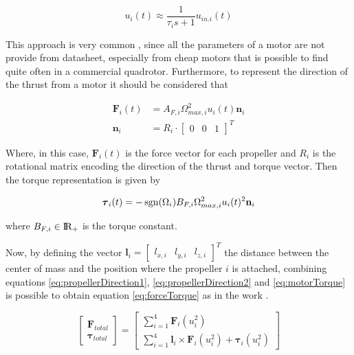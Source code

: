 \begin{equation}
	u_i(t) \approx \frac{1}{\tau_i s+1}u_{in.i}(t)
	\label{eq:motorDelay}
\end{equation}

\noindent This approach is very common \cite{motor}, since all the parameters of a motor are not provide from datasheet, especially from cheap motors that is possible to find quite often in a commercial quadrotor. Furthermore, to represent the direction of the thrust from a motor it should be considered that 

\begin{align}
	\mathbf{F}_i(t) &= A_{F,i} \Omega_{max,i}^2u_i(t)\mathbf{n}_i \label{eq:propellerDirection1} \\
	\mathbf{n}_i &= R_i \cdot 
	\begin{bmatrix} 
		0 & 0 & 1 
	\end{bmatrix}^T 
	\label{eq:propellerDirection2}
\end{align} 

\noindent Where, in this case, $\mathbf{F}_i(t)$ is the force vector for each propeller and $R_i$ is the rotational matrix encoding the direction of the thrust and torque vector. Then the torque representation is given by

\begin{equation}
	\boldsymbol{\tau}_i(t) = -\operatorname*{sgn}(\Omega_i)B_{F,i}\Omega_{max,i}^2u_i(t)^2\mathbf{n}_i
	\label{eq:motorTorque}
\end{equation}

\noindent where $B_{F,i} \in \rm I\!R_+$ is the torque constant.

\noindent Now, by defining the vector $\mathbf{l}_i = \begin{bmatrix} l_{x,i} & l_{y,i} & l_{z,i} \end{bmatrix}^T$ the distance between the center of mass and the position where the propeller $i$ is attached, combining equations \eqref{eq:propellerDirection1}, \eqref{eq:propellerDirection2} and \eqref{eq:motorTorque} is possible to obtain equation \eqref{eq:forceTorque} as in the work \cite{modelIdentification}.

\begin{equation}
	\begin{bmatrix}
		\mathbf{F}_{total} \\
		\boldsymbol{\tau}_{total}
	\end{bmatrix}
	=
	\begin{bmatrix}
		\sum\limits_{i=1}^{4} \mathbf{F}_i(u_i^2) \\
		\sum\limits_{i=1}^{4} \mathbf{l}_i \times \mathbf{F}_i(u_i^2) + \boldsymbol{\tau}_i(u_i^2)
	\end{bmatrix}
	\label{eq:forceTorque}
\end{equation}

